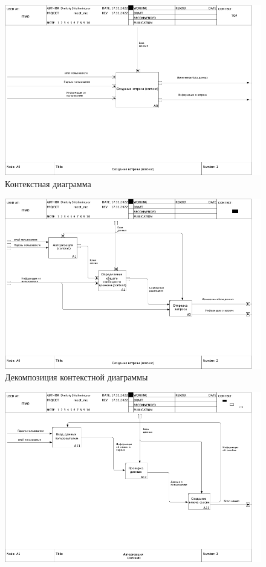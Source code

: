 \documentclass[14pt]{extreport}
\begin{document}
\begin{landscape}
    \begin{figure}[h]   
        \centering
        \includegraphics[width=1\linewidth]{img/01_A0.png}
        \caption{ Контекстная диаграмма}
        \label{fig:d1}
    \end{figure}
    \begin{figure}[h]   
        \centering
        \includegraphics[width=1\linewidth]{img/02_A0.png}
        \caption{ Декомпозиция контекстной диаграммы}
        \label{fig:d2}
    \end{figure}
    \begin{figure}[h]   
        \centering
        \includegraphics[width=1\linewidth]{img/03_A1.png}

\end{figure}
\end{landscape}
\end{document}
